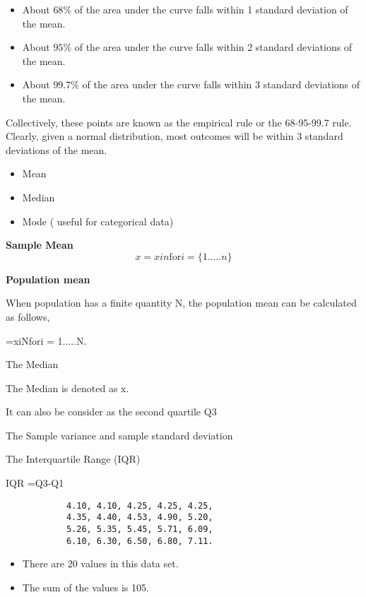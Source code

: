 \documentclass[]{report}
\begin{document}
\begin{itemize}
	\item About $68\%$ of the area under the curve falls within 1 standard deviation of the mean.
	\item About $95\%$ of the area under the curve falls within 2 standard deviations of the mean.
	\item About $99.7\%$ of the area under the curve falls within 3 standard deviations of the mean.
\end{itemize}

Collectively, these points are known as the empirical rule or the 68-95-99.7 rule. Clearly, given a normal distribution, most outcomes will be within 3 standard deviations of the mean.


			\Large  
			\begin{itemize}
				\item Mean
				\item Median
				\item Mode  ( useful for categorical data)
			\end{itemize}

			\Large 
			
			\textbf{Sample Mean}
			\[x=xin    \mbox{for} i = \{1.....n\} \] 
			

			\Large 
			\textbf{Population mean}
			
			
			When population has a finite quantity N, the population mean can be calculated as follows,
			
			=xiNfori = 1.....N.
			

			\Large
			
			The Median
			
			The Median is denoted as x.
			
			It can also be consider as the second quartile Q3
			
			The Sample variance and sample standard deviation
			


			
			The Interquartile Range (IQR)
			
			IQR =Q3-Q1



		\begin{center}
			
			
			\begin{verbatim}
			4.10, 4.10, 4.25, 4.25, 4.25,  
			4.35, 4.40, 4.53, 4.90, 5.20, 
			5.26, 5.35, 5.45, 5.71, 6.09, 
			6.10, 6.30, 6.50, 6.80, 7.11.
			\end{verbatim}
			
			
		\end{center}
		\begin{itemize}
			\item There are 20 values in this data set.
			\item The sum of the values is 105.
		\end{itemize}

	
\end{document}

